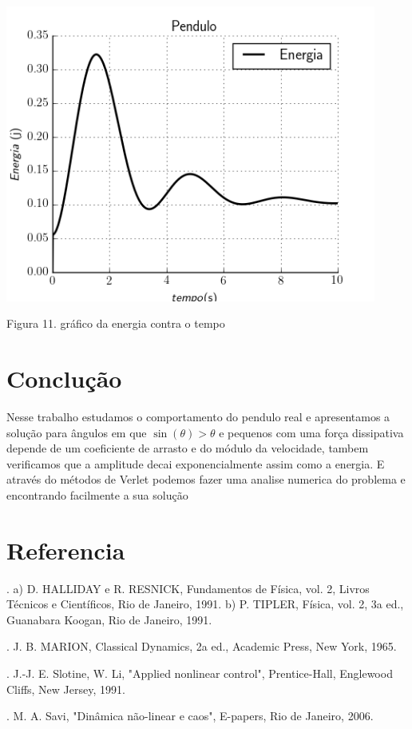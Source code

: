 \documentclass[a4paper]{article} %
\begin{document}
\begin{center}
	
	\includegraphics[width=4.80in,height=3.84in,keepaspectratio = false]{pendulo1_image4.png}
	
	\scriptsize  Figura 11. gr\'afico da energia contra o tempo 
\end{center}

\section{Conclu\c{c}\~ao}

Nesse trabalho estudamos o comportamento do pendulo real e apresentamos a solu\c{c}\~ao para \^angulos em que $\sin(\theta) > \theta$ e pequenos com uma for\c{c}a dissipativa depende de um coeficiente de arrasto e do m\'odulo da velocidade, tambem verificamos que a amplitude decai exponencialmente assim como a energia. E atrav\'es do m\'etodos de Verlet podemos fazer uma analise numerica do problema e encontrando facilmente a sua solu\c{c}\~ao 

\section{Referencia}

\noindent 
{}. a) D. HALLIDAY e R. RESNICK, Fundamentos de F\'isica, vol. 2, Livros T\'ecnicos e Cient\'ificos, Rio de Janeiro, 1991. b) P. TIPLER, F\'isica, vol. 2, 3a ed., Guanabara Koogan, Rio de Janeiro, 1991.

. J. B. MARION, Classical Dynamics, 2a ed., Academic Press, New York, 1965.

. J.-J. E. Slotine, W. Li, "Applied nonlinear control", Prentice-Hall, Englewood Cliffs, New Jersey, 1991.

. M. A. Savi, "Din\^amica n\~ao-linear e caos", E-papers, Rio de Janeiro, 2006.
\end{document}
